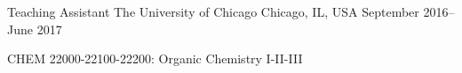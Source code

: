

\begin{cventries}

  \cventry
    {Teaching Assistant} %
    {The University of Chicago} %
    {Chicago, IL, USA} %
    {September 2016--June 2017} %
    {
      \begin{cvitems} %
        \item {CHEM 22000-22100-22200: Organic Chemistry I-II-III}
      \end{cvitems}
    }


\end{cventries}

